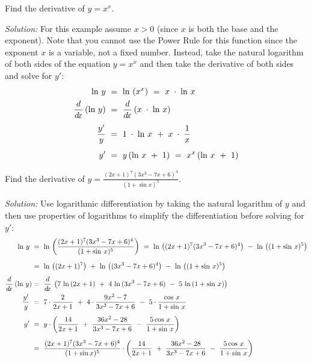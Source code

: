 \begin{exmp}\label{exmp:derivxx}
 Find the derivative of $y = x^x$.\vspace{1mm}
 \par\noindent\emph{Solution:} For this example assume $x > 0$ (since $x$ is
 both the base and the exponent). Note that you cannot use the Power Rule for
 this function since the exponent $x$ is a variable, not a fixed number.
 Instead, take the natural logarithm of both sides of the equation $y = x^x$ and
 then take the derivative of both sides and solve for $y'$:
 \begin{align*}
  \ln\,y ~&=~ \ln\,\left(x^x\right) ~=~ x \;\cdot\; \ln\,x\\
  \frac{d}{d\!x}\,(\ln\,y) ~&=~ \frac{d}{d\!x}\,(x \;\cdot\; \ln\,x)\\[4pt]
  \frac{y'}{y} ~&=~ 1 \;\cdot\; \ln\,x ~+~ x \;\cdot\; \frac{1}{x}\\[4pt]
  y' ~&=~ y \,(\ln\,x ~+~ 1) ~=~ x^x\,(\ln\,x ~+~ 1)
 \end{align*}
\end{exmp}
\begin{exmp}\label{exmp:derivlogdiff}
 Find the derivative of $y = \frac{(2x + 1)^7 (3x^3 - 7x + 6)^4}{(1 + \sin x)^5} $.\vspace{1mm}
 \par\noindent\emph{Solution:} Use logarithmic differentiation by taking the
 natural logarithm of $y$ and then use properties of logarithms to simplify the
 differentiation before solving for $y'$:
 \begin{align*}
  \ln\,y ~&=~ \ln\,\left(\frac{(2x + 1)^7 (3x^3 - 7x + 6)^4}{(1 + \sin\,x)^5}\right)
        ~=~ \ln\,\left((2x + 1)^7 (3x^3 - 7x + 6)^4\right) ~-~ \ln\,\left((1 + \sin\,x)^5\right)\\[6pt]
  &=~ \ln\,\left((2x + 1)^7\right) ~+~ \ln\,\left((3x^3 - 7x + 6)^4\right) ~-~
      \ln\,\left((1 + \sin\,x)^5\right)\\[4pt]
  \frac{d}{d\!x}\,(\ln\,y) &=~ \frac{d}{d\!x}\,\left(7\,\ln\,(2x + 1) ~+~ 4\,\ln\,(3x^3 - 7x + 6) ~-~
                    5\,\ln\,(1 + \sin\,x)\right)\\
  \frac{y'}{y} ~&=~ 7 \cdot \frac{2}{2x + 1} ~+~ 4 \cdot \frac{9x^2 - 7}{3x^3 - 7x + 6} ~-~
                    5 \cdot \frac{\cos\,x}{1 + \sin\,x}\\[4pt]
  y' ~&=~ y \cdot \left(\frac{14}{2x + 1} ~+~ \frac{36x^2 - 28}{3x^3 - 7x + 6} ~-~
          \frac{5 \cos\,x}{1 + \sin\,x}\right)\\[6pt]
  &=~ \frac{(2x + 1)^7 (3x^3 - 7x + 6)^4}{(1 + \sin x)^5}
      \cdot \left(\frac{14}{2x + 1} ~+~ \frac{36x^2 - 28}{3x^3 - 7x + 6} ~-~
      \frac{5 \cos\,x}{1 + \sin\,x}\right)
 \end{align*}
\end{exmp}

